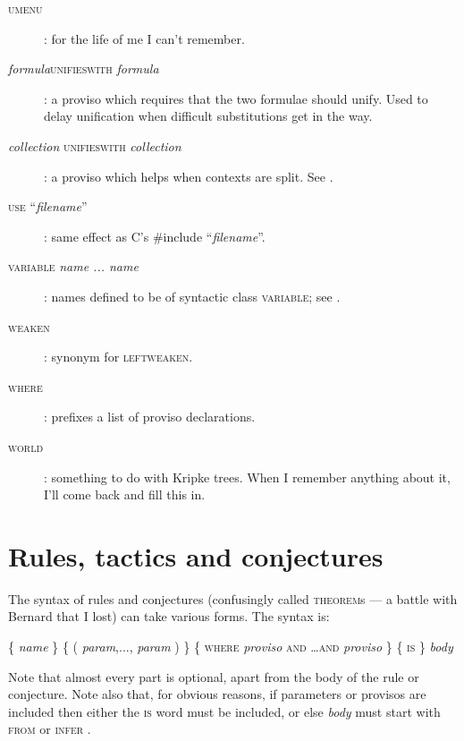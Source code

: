 \begin{description}
\item[\textsc{umenu}]: for the life of me I can't remember.
     
\item[\textit{formula}\textsc{unifieswith} \textit{formula}]: a proviso which requires that the two formulae should unify. Used to delay unification when difficult substitutions get in the way.


\item[\textit{collection} \textsc{unifieswith} \textit{collection}]: a proviso which helps when contexts are split. See .

\item[\textsc{use} ``\textit{filename}'']: same effect as C's \#include ``\textit{filename}''.

\item[\textsc{variable} \textit{name ... name}]: names defined to be of syntactic class \textsc{variable}; see .

\item[\textsc{weaken}]: synonym for \textsc{leftweaken}.

\item[\textsc{where}]: prefixes a list of proviso declarations.

\item[\textsc{world}]: something to do with Kripke trees. When I remember anything about it, I'll come back and fill this in.

\end{description}
 
\section{Rules, tactics and conjectures}
\label{sec:paraformlang:rulestacticsconjectures}

The syntax of rules and conjectures (confusingly called \textsc{theorem}s --- a battle with Bernard that I lost) can take various forms. The syntax is:

\{ \textit{name} \} \{ ( \textit{param},..., \textit{param} ) \} \{ \textsc{where} \textit{proviso} \textsc{and \dots and} \textit{proviso} \} \{ \textsc{is} \} \textit{body}

Note that almost every part is optional, apart from the body of the rule or conjecture. Note also that, for obvious reasons, if parameters or provisos are included then either the \textsc{is} word must be included, or else \textit{body} must start with \textsc{from} or \textsc{ infer }.

